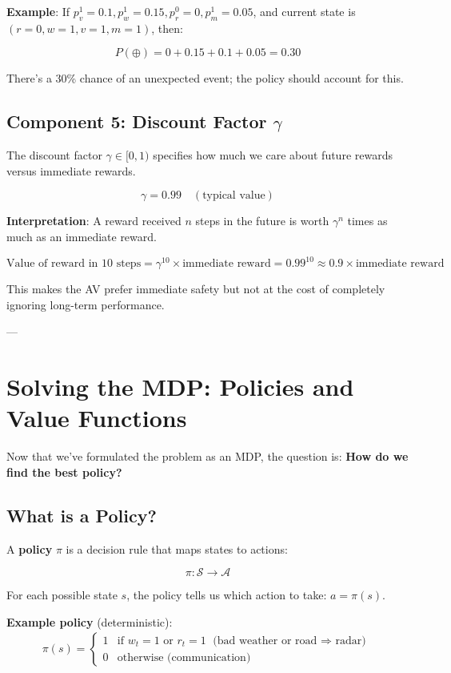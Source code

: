 \documentclass[12pt,a4paper]{article}
\begin{document}
\textbf{Example}: If $p_v^1 = 0.1, p_w^1 = 0.15, p_r^0 = 0, p_m^1 = 0.05$, and current state is $(r=0, w=1, v=1, m=1)$, then:

\[
P(\oplus) = 0 + 0.15 + 0.1 + 0.05 = 0.30
\]

There's a 30\% chance of an unexpected event; the policy should account for this.

\subsection{Component 5: Discount Factor $\gamma$}

The discount factor $\gamma \in [0, 1)$ specifies how much we care about future rewards versus immediate rewards.

\[
\gamma = 0.99 \quad (\text{typical value})
\]

\textbf{Interpretation}: A reward received $n$ steps in the future is worth $\gamma^n$ times as much as an immediate reward.

\[
\text{Value of reward in 10 steps} = \gamma^{10} \times \text{immediate reward} = 0.99^{10} \approx 0.9 \times \text{immediate reward}
\]

This makes the AV prefer immediate safety but not at the cost of completely ignoring long-term performance.

---

\section{Solving the MDP: Policies and Value Functions}
\label{sec:solving}

Now that we've formulated the problem as an MDP, the question is: \textbf{How do we find the best policy?}

\subsection{What is a Policy?}

A \textbf{policy} $\pi$ is a decision rule that maps states to actions:

\[
\pi: \mathcal{S} \to \mathcal{A}
\]

For each possible state $s$, the policy tells us which action to take: $a = \pi(s)$.

\textbf{Example policy} (deterministic):
\begin{align}
\pi(s) = \begin{cases}
1 & \text{if } w_t = 1 \text{ or } r_t = 1 \text{ (bad weather or road $\Rightarrow$ radar)} \\
0 & \text{otherwise (communication)}
\end{cases}
\end{align}
\end{document}
